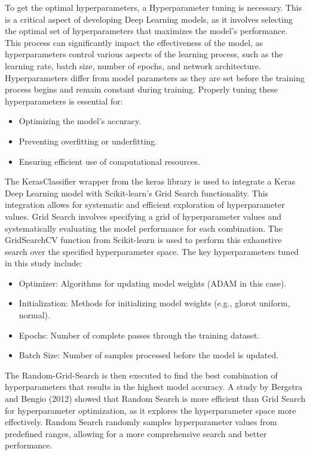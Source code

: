To get the optimal hyperparameters, a Hyperparameter tuning is necessary. This is a critical aspect of developing Deep Learning models, as it involves selecting the optimal set of hyperparameters that maximizes the model's performance. This process can significantly impact the effectiveness of the model, as hyperparameters control various aspects of the learning process, such as the learning rate, batch size, number of epochs, and network architecture. Hyperparameters differ from model parameters as they are set before the training process begins and remain constant during training. Properly tuning these hyperparameters is essential for: \autocite{hutterAutomatedMachineLearning2019}

\begin{itemize}
    \item Optimizing the model's accuracy.
    \item Preventing overfitting or underfitting.
    \item Ensuring efficient use of computational resources.
\end{itemize}

The KerasClassifier wrapper from the keras library is used to integrate a Keras Deep Learning model with Scikit-learn's Grid Search functionality. This integration allows for systematic and efficient exploration of hyperparameter values. Grid Search involves specifying a grid of hyperparameter values and systematically evaluating the model performance for each combination. The GridSearchCV function from Scikit-learn is used to perform this exhaustive search over the specified hyperparameter space. The key hyperparameters tuned in this study include:

\begin{itemize}
    \item Optimizer: Algorithms for updating model weights (ADAM in this case).
    \item Initialization: Methods for initializing model weights (e.g., glorot uniform, normal).
    \item Epochs: Number of complete passes through the training dataset.
    \item Batch Size: Number of samples processed before the model is updated.
\end{itemize}

The Random-Grid-Search is then executed to find the best combination of hyperparameters that results in the highest model accuracy. A study by Bergstra and Bengio (2012) showed that Random Search is more efficient than Grid Search for hyperparameter optimization, as it explores the hyperparameter space more effectively. Random Search randomly samples hyperparameter values from predefined ranges, allowing for a more comprehensive search and better performance. \autocite{bergstraRandomSearchHyperParameter}


